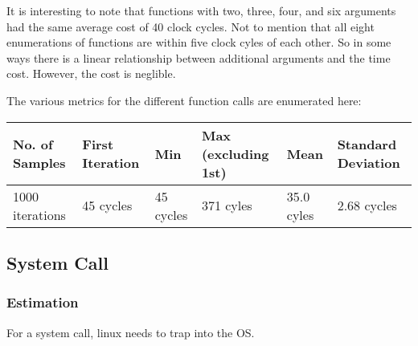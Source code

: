 \documentclass[paper=a4, fontsize=11pt]{scrartcl}
\numberwithin{equation}{section}		%
\numberwithin{figure}{section}			%
\numberwithin{table}{section}				%
\begin{document}
It is interesting to note that functions with two, three, four, and six arguments had the same average cost of 40 clock cycles.  Not to mention that all eight enumerations of functions are within five clock cyles of each other.  So in some ways there is a linear relationship between additional arguments and the time cost.  However, the cost is neglible.

The various metrics for the different function calls are enumerated here:

\begin{center}
    \begin{tabular}{ | l | l | l | l | l | l |}
    \hline
    No. of Samples & First Iteration & Min & Max (excluding 1st) & Mean & Standard Deviation \\ \hline
    1000 iterations & 45 cycles & 45 cycles & 371 cyles & 35.0 cyles & 2.68 cycles \\ 
    \hline
    \end{tabular}
\end{center}

\subsection{System Call}

\subsubsection{Estimation}

For a system call, linux needs to trap into the OS. 


\end{document}

